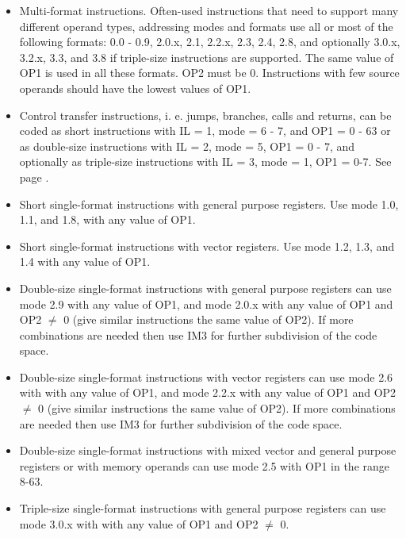 \documentclass[forwardcom.tex]{subfiles}
\begin{document}
\begin{itemize}
\item Multi-format instructions. Often-used instructions that need to support many different operand types, addressing modes and formats use all or most of the following formats: 0.0 - 0.9, 2.0.x, 2.1, 2.2.x, 2.3, 2.4, 2.8, and optionally 3.0.x, 3.2.x, 3.3, and 3.8 if triple-size instructions are supported. The same value of OP1 is used in all these formats. OP2 must be 0. Instructions with few source operands should have the lowest values of OP1.

\item Control transfer instructions, i. e. jumps, branches, calls and returns, can be coded as short instructions with IL = 1, mode = 6 - 7, and OP1 = 0 - 63 or as double-size instructions with IL = 2, mode = 5, OP1 = 0 - 7, and optionally as triple-size instructions with IL = 3, mode = 1, OP1 = 0-7. See page \pageref{table:jumpInstructionFormats}.

\item Short single-format instructions with general purpose registers. Use mode 1.0, 1.1, and 1.8, with  any value of OP1.

\item Short single-format instructions with vector registers. Use mode 1.2, 1.3, and 1.4 with any value of OP1.

\item Double-size single-format instructions with general purpose registers can use mode 2.9 with any value of OP1, and mode 2.0.x with any value of OP1 and OP2 $\neq$ 0 (give similar instructions the same value of OP2). If more combinations are needed then use IM3 for further subdivision of the code space.

\item Double-size single-format instructions with vector registers can use mode 2.6 with with any value of OP1, and mode 2.2.x with any value of OP1 and OP2 $\neq$ 0 (give similar instructions the same value of OP2). If more combinations are needed then use IM3 for further subdivision of the code space.

\item Double-size single-format instructions with mixed vector and general purpose registers or with memory operands can use mode 2.5 with OP1 in the range 8-63.

\item Triple-size single-format instructions with general purpose registers can use mode 3.0.x with with any value of OP1 and OP2 $\neq$ 0.


\end{itemize}
\end{document}
